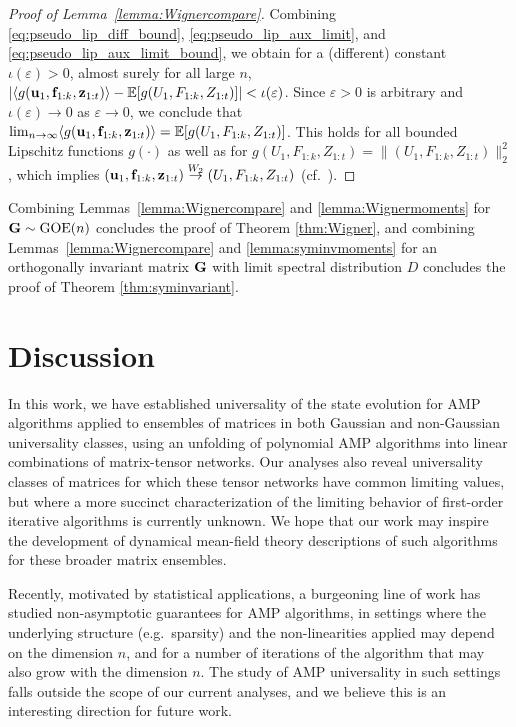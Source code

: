 \documentclass[10pt,reqno]{amsart}
\def\GOE{\operatorname{GOE}}
\def\toWtwo{\overset{W_2}{\to}}
\def\eps{\varepsilon}
\begin{document}
\begin{proof}[Proof of Lemma~\ref{lemma:Wignercompare}]
Combining \eqref{eq:pseudo_lip_diff_bound}, 
\eqref{eq:pseudo_lip_aux_limit}, and \eqref{eq:pseudo_lip_aux_limit_bound}, we 
obtain for a (different) constant $\iota(\eps)>0$, almost surely for all large
$n$, $|\langle g(\ub_1, \fb_{1:k}, \zb_{1:t})\rangle - \EE[g(U_1, F_{1:k},
Z_{1:t})]| < \iota(\eps)$.
Since $\eps>0$ is arbitrary and $\iota(\eps) \to 0$ as $\eps \to 0$, we conclude
that
$\lim_{n \to \infty} \langle g(\mathbf{u}_1, \mathbf{f}_{1:k}, \mathbf{z}_{1:t})\rangle = 
\mathbb{E}[g(U_1, F_{1:k}, Z_{1:t})]$.
This holds for all bounded Lipschitz functions $g(\cdot)$ as well as for
$g(U_1, F_{1:k}, Z_{1:t})=\|(U_1, F_{1:k}, Z_{1:t})\|_2^2$,
which implies $(\ub_1, \fb_{1:k}, \zb_{1:t}) \toWtwo (U_1, F_{1:k}, Z_{1:t})$
(cf.\ \cite[Definition 6.8 and Theorem 6.9]{villani2009optimal}).
\end{proof}

Combining Lemmas~\ref{lemma:Wignercompare} and \ref{lemma:Wignermoments}
for $\bG \sim \GOE(n)$ concludes the proof of Theorem \ref{thm:Wigner}, and 
combining Lemmas~\ref{lemma:Wignercompare} and \ref{lemma:syminvmoments}
for an orthogonally invariant matrix $\mathbf{G}$ with limit spectral distribution $D$
concludes the proof of Theorem \ref{thm:syminvariant}.


\section{Discussion}\label{sec:future}
In this work, we have established universality of the state evolution
for AMP algorithms applied to ensembles of matrices in both
Gaussian and non-Gaussian
universality classes, using an unfolding of polynomial AMP algorithms
into linear combinations of matrix-tensor networks.
Our analyses also reveal universality classes of matrices for which these tensor
networks have common limiting values, but where a more succinct
characterization of the limiting behavior of first-order iterative algorithms
is currently unknown. We hope that our work may inspire the development of
dynamical mean-field theory descriptions of such algorithms for these broader
matrix ensembles.

Recently, motivated by statistical applications, a burgeoning line of work
\cite{rush2018finite,li2022non,cademartori2023non,li2023approximate} has
studied non-asymptotic guarantees for AMP algorithms, in settings where the
underlying structure (e.g.\ sparsity) and the non-linearities applied may
depend on the dimension $n$, and for a number of iterations of the algorithm
that may also grow with the dimension $n$.
The study of AMP universality in such settings falls outside the scope of our
current analyses, and we believe this is an interesting direction for future work.
\end{document}
